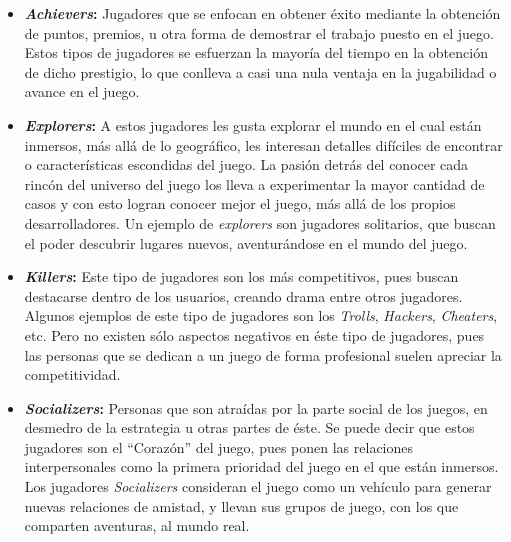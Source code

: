 \begin{itemize}
    \item {\bf \emph{Achievers}:}
        Jugadores que se enfocan en obtener éxito mediante la obtención de puntos,
        premios, u otra forma de demostrar el trabajo puesto en el juego.
        Estos tipos de jugadores se esfuerzan la mayoría del tiempo en la obtención
        de dicho prestigio, lo que conlleva a casi una nula ventaja en la
        jugabilidad o avance en el juego.

    \item {\bf \emph{Explorers}:}
        A estos jugadores les gusta explorar el mundo en el cual están inmersos,
        más allá de lo geográfico, les interesan detalles difíciles de encontrar o
        características escondidas del juego.
        La pasión detrás del conocer cada rincón del universo del juego los lleva
        a experimentar la mayor cantidad de casos y con esto logran conocer mejor
        el juego, más allá de los propios desarrolladores.
        Un ejemplo de \emph{explorers} son jugadores solitarios, que buscan el
        poder descubrir lugares nuevos, aventurándose en el mundo del juego.

    \item {\bf \emph{Killers}:}
        Este tipo de jugadores son los más competitivos, pues buscan destacarse
        dentro de los usuarios, creando drama entre otros jugadores.
        Algunos ejemplos de este tipo de jugadores son los \emph{Trolls},
        \emph{Hackers}, \emph{Cheaters}, etc.
        Pero no existen sólo aspectos negativos en éste tipo de jugadores,
        pues las personas que se dedican a un juego de forma profesional
        suelen apreciar la competitividad.

    \item {\bf \emph{Socializers}:}
        Personas que son atraídas por la parte social de los juegos,
        en desmedro de la estrategia u otras partes de éste.
        Se puede decir que estos jugadores son el ``Corazón'' del juego,
        pues ponen las relaciones interpersonales como la primera prioridad
        del juego en el que están inmersos.
        Los jugadores \emph{Socializers} consideran el juego
        como un vehículo para generar nuevas relaciones de amistad, y llevan
        sus grupos de juego, con los que comparten aventuras, al mundo real.

\end{itemize}

